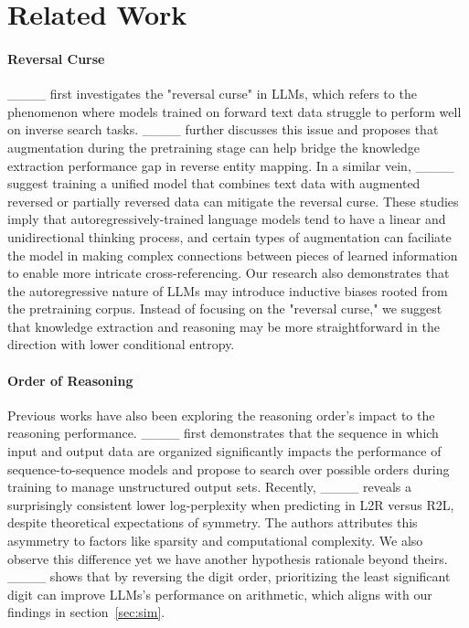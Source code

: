 \section{Related Work}
\paragraph{Reversal Curse} 
____ first investigates the "reversal curse" in LLMs, which refers to the phenomenon where models trained on forward text data struggle to perform well on inverse search tasks. ____ further discusses this issue and proposes that augmentation during the pretraining stage can help bridge the knowledge extraction performance gap in reverse entity mapping. In a similar vein, ____ suggest training a unified model that combines text data with augmented reversed or partially reversed data can mitigate the reversal curse.
These studies imply that autoregressively-trained language models tend to have a linear and unidirectional thinking process, and certain types of augmentation can faciliate the model in making complex connections between pieces of learned information to enable more intricate cross-referencing. Our research also demonstrates that the autoregressive nature of LLMs may introduce inductive biases rooted from the pretraining corpus. Instead of focusing on the "reversal curse," we suggest that knowledge extraction and reasoning may be more straightforward in the direction with lower conditional entropy.


\paragraph{Order of Reasoning} 
Previous works have also been exploring the reasoning order's impact to the reasoning performance. ____ first demonstrates that the sequence in which input and output data are organized significantly impacts the performance of sequence-to-sequence models and propose to search over possible orders during training to manage unstructured output sets.
Recently, ____ reveals a surprisingly consistent lower log-perplexity when predicting in L2R versus R2L, despite theoretical expectations of symmetry. The authors attributes this asymmetry to factors like sparsity and computational complexity. We also observe this difference yet we have another hypothesis rationale beyond theirs. 
____ shows that by reversing the digit order, prioritizing the least significant digit can improve LLMs's performance on arithmetic, which aligns with our findings in section~\ref{sec:sim}. 



